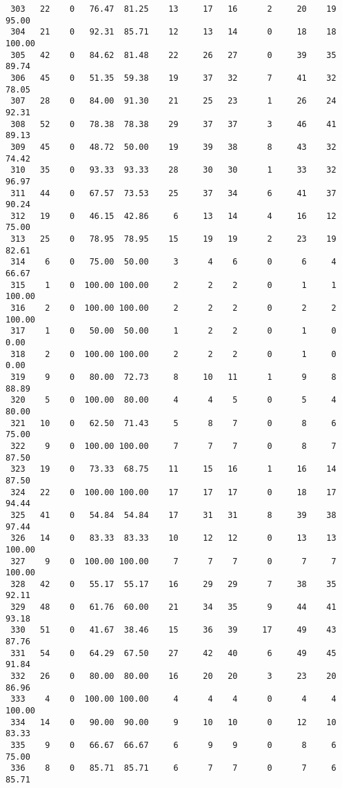 \begin{verbatim}
 303   22    0   76.47  81.25    13     17   16      2     20    19    95.00
 304   21    0   92.31  85.71    12     13   14      0     18    18   100.00
 305   42    0   84.62  81.48    22     26   27      0     39    35    89.74
 306   45    0   51.35  59.38    19     37   32      7     41    32    78.05
 307   28    0   84.00  91.30    21     25   23      1     26    24    92.31
 308   52    0   78.38  78.38    29     37   37      3     46    41    89.13
 309   45    0   48.72  50.00    19     39   38      8     43    32    74.42
 310   35    0   93.33  93.33    28     30   30      1     33    32    96.97
 311   44    0   67.57  73.53    25     37   34      6     41    37    90.24
 312   19    0   46.15  42.86     6     13   14      4     16    12    75.00
 313   25    0   78.95  78.95    15     19   19      2     23    19    82.61
 314    6    0   75.00  50.00     3      4    6      0      6     4    66.67
 315    1    0  100.00 100.00     2      2    2      0      1     1   100.00
 316    2    0  100.00 100.00     2      2    2      0      2     2   100.00
 317    1    0   50.00  50.00     1      2    2      0      1     0     0.00
 318    2    0  100.00 100.00     2      2    2      0      1     0     0.00
 319    9    0   80.00  72.73     8     10   11      1      9     8    88.89
 320    5    0  100.00  80.00     4      4    5      0      5     4    80.00
 321   10    0   62.50  71.43     5      8    7      0      8     6    75.00
 322    9    0  100.00 100.00     7      7    7      0      8     7    87.50
 323   19    0   73.33  68.75    11     15   16      1     16    14    87.50
 324   22    0  100.00 100.00    17     17   17      0     18    17    94.44
 325   41    0   54.84  54.84    17     31   31      8     39    38    97.44
 326   14    0   83.33  83.33    10     12   12      0     13    13   100.00
 327    9    0  100.00 100.00     7      7    7      0      7     7   100.00
 328   42    0   55.17  55.17    16     29   29      7     38    35    92.11
 329   48    0   61.76  60.00    21     34   35      9     44    41    93.18
 330   51    0   41.67  38.46    15     36   39     17     49    43    87.76
 331   54    0   64.29  67.50    27     42   40      6     49    45    91.84
 332   26    0   80.00  80.00    16     20   20      3     23    20    86.96
 333    4    0  100.00 100.00     4      4    4      0      4     4   100.00
 334   14    0   90.00  90.00     9     10   10      0     12    10    83.33
 335    9    0   66.67  66.67     6      9    9      0      8     6    75.00
 336    8    0   85.71  85.71     6      7    7      0      7     6    85.71

\end{verbatim}
